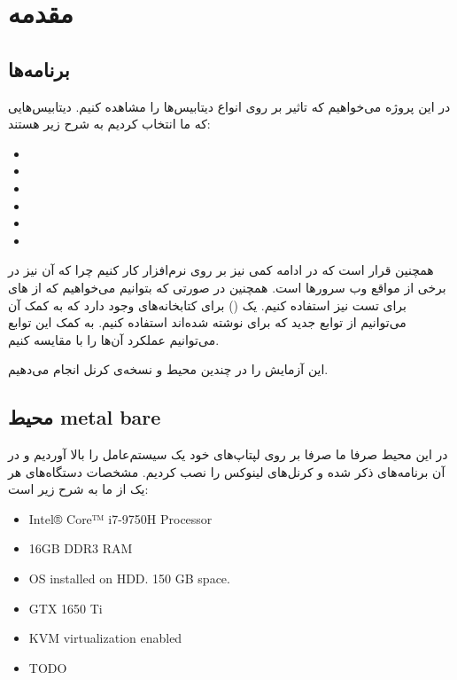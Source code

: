 \section{مقدمه}
\subsection{برنامه‌ها}
در این پروژه می‌خواهیم که تاثیر
بر روی انواع دیتابیس‌ها را مشاهده کنیم. دیتابیس‌هایی که ما انتخاب کردیم به شرح زیر هستند:
\begin{itemize}
	\item {}
	\item {}
	\item {}
	\item {}
	\item {}
	\item {}
\end{itemize}
همچنین قرار است که در ادامه کمی نیز بر روی نرم‌افزار
کار کنیم چرا که آن نیز در برخی از مواقع
وب سرور‌ها است. همچنین در صورتی که بتوانیم می‌خواهیم که از
های
برای تست نیز استفاده کنیم. یک
()
برای کتابخانه‌های
وجود دارد که به کمک آن می‌توانیم از توابع جدید
که برای
نوشته شده‌اند استفاده کنیم. به کمک این توابع می‌توانیم عملکرد آن‌ها را با
مقایسه کنیم.

این آزمایش را در چندین محیط و نسخه‌ی کرنل انجام می‌دهیم.
\subsection{محیط‌ metal bare}
در این محیط صرفا ما صرفا بر روی لپتاپ‌های خود یک سیستم‌عامل
را بالا آوردیم و در آن برنامه‌های ذکر شده و کرنل‌های لینوکس را نصب کردیم. مشخصات دستگاه‌های هر یک از ما به شرح
زیر است:

\begin{latin}
\begin{itemize}
	\item Intel® Core™ i7-9750H Processor
	\item 16GB DDR3 RAM
	\item OS installed on HDD. 150 GB space.
	\item GTX 1650 Ti
	\item KVM virtualization enabled
\end{itemize}
\end{latin}
\begin{latin}
\begin{itemize}
	\item TODO
\end{itemize}
\end{latin}

